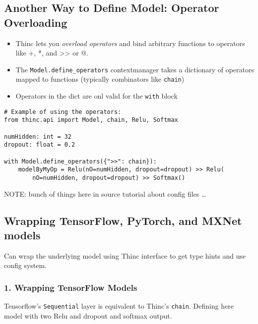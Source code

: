 \documentclass[
]{article}
\providecommand{\tightlist}{%
  \setlength{\itemsep}{0pt}\setlength{\parskip}{0pt}}
\begin{document}
\hypertarget{another-way-to-define-model-operator-overloading}{%
\subsection{Another Way to Define Model: Operator
Overloading}\label{another-way-to-define-model-operator-overloading}}

\begin{itemize}
\tightlist
\item
  Thinc lets you \emph{overload operators} and bind arbitrary functions
  to operators like +, *, and \textgreater\textgreater{} or @.
\item
  The \texttt{Model.define_operators} contextmanager takes
  a dictionary of operators mapped to functions (typically combinators
  like \texttt{chain})
\item
  Operators in the dict are onl valid for the
  \texttt{with} block
\end{itemize}

\begin{verbatim}
# Example of using the operators:
from thinc.api import Model, chain, Relu, Softmax

numHidden: int = 32
dropout: float = 0.2

with Model.define_operators({">>": chain}):
    modelByMyOp = Relu(nO=numHidden, dropout=dropout) >> Relu(
        nO=numHidden, dropout=dropout) >> Softmax()
\end{verbatim}

NOTE: bunch of things here in source tutorial about config files
\ldots{}

\hypertarget{wrapping-tensorflow-pytorch-and-mxnet-models}{%
\subsection{Wrapping TensorFlow, PyTorch, and MXNet
models}\label{wrapping-tensorflow-pytorch-and-mxnet-models}}

Can wrap the underlying model using Thinc interface to get type hints
and use config system.

\hypertarget{wrapping-tensorflow-models}{%
\subsubsection{1. Wrapping TensorFlow
Models}\label{wrapping-tensorflow-models}}

Tensorflow's \texttt{Sequential} layer is equivalent to
Thinc's \texttt{chain}. Defining here model with two Relu
and dropout and softmax output.
\end{document}
